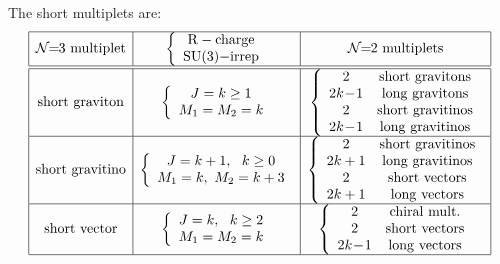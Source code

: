 \documentclass[a4paper,12pt]{article}
\begin{document}
The short multiplets are:
\begin{equation}
\begin{array}{|c|c|c|}
\hline
{\cal N}\!\!=\!\!3\ {\rm multiplet}&
\left\{\begin{array}{c}
{\rm R-charge}\\
\mathrm{SU(3)}{\rm -irrep}
\end{array}\right.&
{\cal N}\!\!=\!\!2\ {\rm multiplets}\\
\hline
\hline
{\rm short\ graviton}&
\left\{\begin{array}{c}
J=k\geq 1\\
M_1=M_2=k
\end{array}\right.&
\left\{\begin{array}{cc}
2&{\rm short\ gravitons}\\
2k\!-\!1&{\rm long\ gravitons}\\
2&{\rm short\ gravitinos}\\
2k\!-\!1&{\rm long\ gravitinos}\\
\end{array}\right.\\
\hline
{\rm short\ gravitino}&
\left\{\begin{array}{c}
J=k+1,\ \ k\geq 0\\
M_1=k,\ M_2=k+3
\end{array}\right.&
\left\{\begin{array}{cc}
2&{\rm short\ gravitinos}\\
2k+1&{\rm long\ gravitinos}\\
2&{\rm short\ vectors}\\
2k+1&{\rm long\ vectors}\\
\end{array}\right.\\
\hline
{\rm short\ vector}&
\left\{\begin{array}{c}
J=k,\ \ k\geq 2\\
M_1=M_2=k
\end{array}\right.&
\left\{\begin{array}{cc}
2&{\rm chiral\ mult.}\\
2&{\rm short\ vectors}\\
2k\!-\!1&{\rm long\ vectors}
\end{array}\right.\\
\hline
\end{array}\label{N=3short}
\end{equation}
\end{document}
